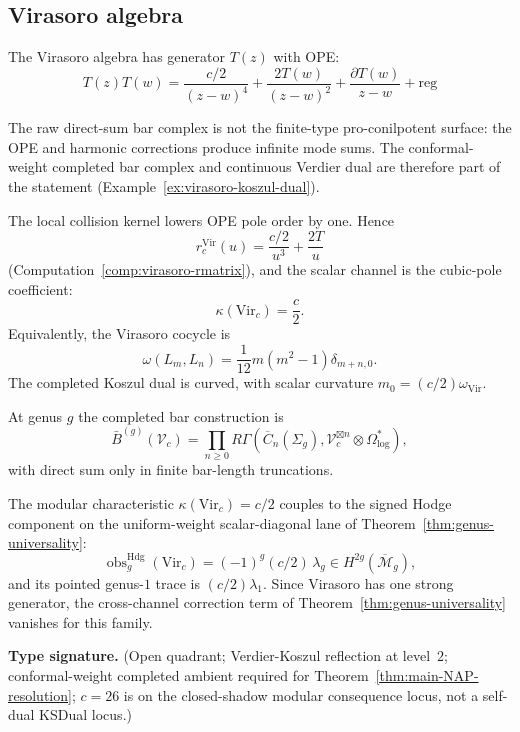 \subsection{Virasoro algebra}

\begin{example}\label{ex:virasoro-NAP}
The Virasoro algebra has generator $T(z)$ with OPE:
\[T(z) T(w) = \frac{c/2}{(z-w)^4} + \frac{2T(w)}{(z-w)^2} + \frac{\partial T(w)}{z-w} + \text{reg}\]

The raw direct-sum bar complex is not the finite-type
pro-conilpotent surface: the OPE and harmonic corrections produce
infinite mode sums. The conformal-weight completed bar complex and
continuous Verdier dual are therefore part of the statement
\textup{(}Example~\ref{ex:virasoro-koszul-dual}\textup{)}.

The local collision kernel lowers OPE pole order by one. Hence
\[
r^{\mathrm{Vir}}_c(u)
=
\frac{c/2}{u^3}+\frac{2T}{u}
\]
\textup{(}Computation~\ref{comp:virasoro-rmatrix}\textup{)}, and the
scalar channel is the cubic-pole coefficient:
\[
\kappa(\mathrm{Vir}_c)=\frac{c}{2}.
\]
Equivalently, the Virasoro cocycle is
\[
\omega(L_m,L_n)=\frac{1}{12}m(m^2-1)\delta_{m+n,0}.
\]
The completed Koszul dual is curved, with scalar curvature
$m_0=(c/2)\omega_{\mathrm{Vir}}$.

At genus $g$ the completed bar construction is
\[
\bar{B}^{(g)}(\mathcal{V}_c)
=
\prod_{n \geq 0}
R\Gamma\!\left(
\overline{C}_n(\Sigma_g),
\mathcal{V}_c^{\boxtimes n}\otimes\Omega^*_{\log}
\right),
\]
with direct sum only in finite bar-length truncations.

The modular characteristic $\kappa(\mathrm{Vir}_c)=c/2$ couples to
the signed Hodge component on the uniform-weight scalar-diagonal lane of
Theorem~\ref{thm:genus-universality}:
\[
\operatorname{obs}^{\mathrm{Hdg}}_g(\mathrm{Vir}_c)
=(-1)^g(c/2)\,\lambda_g
\in H^{2g}(\overline{\mathcal{M}}_g),
\]
and its pointed genus-$1$ trace is $(c/2)\lambda_1$. Since Virasoro has one
strong generator, the cross-channel correction term of
Theorem~\ref{thm:genus-universality} vanishes for this family.

\begin{proposition}[Virasoro NAP duality at \texorpdfstring{$c=26$}{c=26};
\ClaimStatusConditional]\label{prop:virasoro-c26-selfdual}
\textbf{Type signature.} (Open quadrant; Verdier-Koszul reflection at
level~$2$; conformal-weight completed ambient required for
Theorem~\ref{thm:main-NAP-resolution}; $c=26$ is on the closed-shadow
modular consequence locus, not a self-dual KSDual locus.)


\end{proposition}
\end{example}
